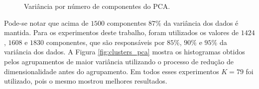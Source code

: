 \documentclass[conference]{IEEEtran}
\begin{document}
\begin{figure}[!h]
	\centering
	{
	}
	\caption{\small Variância por número de componentes do PCA.}
	\label{fig:var_comp}
\end{figure}

Pode-se notar que acima de $1500$ componentes $87\%$  da variância dos dados é mantida. Para os experimentos deste trabalho, foram utilizados os valores de $1424$, $1608$ e $1830$ componentes, que são responsáveis por $85\%$, $90\%$ e $95\%$ da variância dos dados. A Figura \ref{fig:clusters_pca} mostra os histogramas obtidos pelos agrupamentos de maior variância utilizando o processo de redução de dimensionalidade antes do agrupamento. Em todos esses experimentos $K = 79$ foi utilizado, pois o mesmo mostrou melhores resultados.
\end{document}
